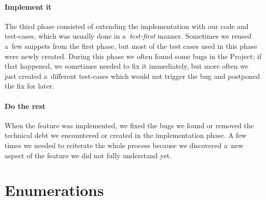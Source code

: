 \documentclass[nolot,nolof,nocover,printed]{fithesis3}
\newcommand{\Project}{Project\xspace}
\begin{document}
\paragraph{Implement it} The third phase consisted of extending the implementation with our code and test-cases, which was usually done in a~\textit{test-first} manner. Sometimes we reused a~few snippets from the first phase, but most of the test cases used in this phase were newly created. During this phase we often found some bugs in the \Project; if that happened, we sometimes needed to fix it immediately, but more often we just created a~different test-cases which would not trigger the bug and postponed the fix for later.

\paragraph{Do the rest} When the feature was implemented, we fixed the bugs we found or removed the technical debt we encountered or created in the implementation phase. A few times we needed to reiterate the whole process because we discovered a~new aspect of the feature we did not fully understand yet.




	


\section{Enumerations}

\end{document}
